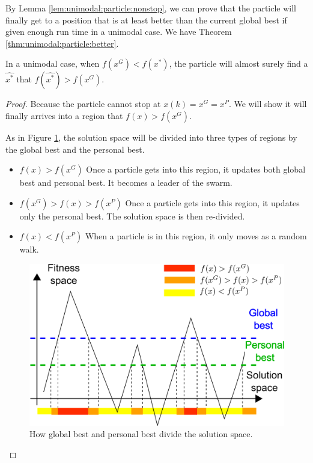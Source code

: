 
By Lemma \ref{lem:unimodal:particle:nonstop}, we can prove that the particle will finally get to a position that is at least better than the current global best if given enough run time in a unimodal case.
We have Theorem \ref{thm:unimodal:particle:better}.

\begin{mythm}
\label{thm:unimodal:particle:better}
In a unimodal case, when $ f( x^{G} ) < f( x^{*}) $, the particle will almost surely find a $ \hat{x^{*}} $ that $ f(\hat{x^{*}}) > f(x^{G}) $.
\begin{proof}
Because the particle cannot stop at $ x(k) = x^{G} = x^{P} $.
We will show it will finally arrives into a region that $ f(x) > f(x^{G}) $.

As in Figure \ref{fig:categorize_regions}, the solution space will be divided into three types of regions by the global best and the personal best.
\begin{itemize}
\item $ f(x) > f(x^G) $
Once a particle gets into this region, it updates both global best and personal best. 
It becomes a leader of the swarm.
\item $ f(x^{G}) > f(x) > f(x^{P}) $
Once a particle gets into this region, it updates only the personal best.
The solution space is then re-divided.
\item $ f(x) < f(x^{P}) $
When a particle is in this region, it only moves as a random walk.
\end{itemize}

\begin{figure}
\centering
\includegraphics[width=0.7\linewidth]{./fig/categorize_regions}
\caption{How global best and personal best divide the solution space.}
\label{fig:categorize_regions}
\end{figure}


\end{proof}
\end{mythm}
